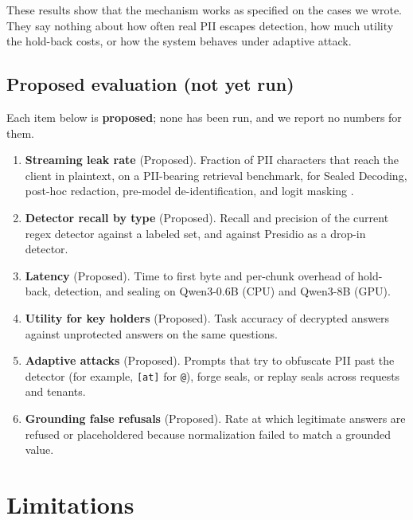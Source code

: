 \documentclass[11pt]{article}
\newcommand{\code}[1]{\texttt{#1}}
\begin{document}
These results show that the mechanism works as specified on the cases we wrote. They say nothing about how often real PII escapes detection, how much utility the hold-back costs, or how the system behaves under adaptive attack.

\subsection{Proposed evaluation (not yet run)}
\label{sec:proposed}

Each item below is \textbf{proposed}; none has been run, and we report no numbers for them.
\begin{enumerate}
  \item \textbf{Streaming leak rate} (Proposed). Fraction of PII characters that reach the client in plaintext, on a PII-bearing retrieval benchmark, for Sealed Decoding, post-hoc redaction, pre-model de-identification, and logit masking \citep{ram2025constrained}.
  \item \textbf{Detector recall by type} (Proposed). Recall and precision of the current regex detector against a labeled set, and against Presidio as a drop-in detector.
  \item \textbf{Latency} (Proposed). Time to first byte and per-chunk overhead of hold-back, detection, and sealing on Qwen3-0.6B (CPU) and Qwen3-8B (GPU).
  \item \textbf{Utility for key holders} (Proposed). Task accuracy of decrypted answers against unprotected answers on the same questions.
  \item \textbf{Adaptive attacks} (Proposed). Prompts that try to obfuscate PII past the detector (for example, \code{[at]} for \code{@}), forge seals, or replay seals across requests and tenants.
  \item \textbf{Grounding false refusals} (Proposed). Rate at which legitimate answers are refused or placeholdered because normalization failed to match a grounded value.
\end{enumerate}

\section{Limitations}
\label{sec:limitations}
\end{document}
